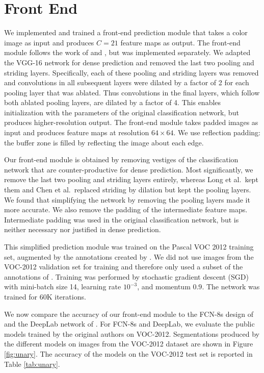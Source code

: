 \documentclass{article} %
\newcommand{\timess}{\mathbin{\!\times\!}}
\begin{document}
\section{Front End}
\label{sec:front-end}

We implemented and trained a front-end prediction module that takes a color image as input and produces $C=21$ feature maps as output. The front-end module follows the work of \cite{Long2015} and \cite{Chen2015ICLR}, but was implemented separately. We adapted the VGG-16 network \citep{SimonyanZisserman2015} for dense prediction and removed the last two pooling and striding layers. Specifically, each of these pooling and striding layers was removed and convolutions in all subsequent layers were dilated by a factor of 2 for each pooling layer that was ablated. Thus convolutions in the final layers, which follow both ablated pooling layers, are dilated by a factor of 4. This enables initialization with the parameters of the original classification network, but produces higher-resolution output. The front-end module takes padded images as input and produces feature maps at resolution $64\timess 64$. We use reflection padding: the buffer zone is filled by reflecting the image about each edge.

Our front-end module is obtained by removing vestiges of the classification network that are counter-productive for dense prediction. Most significantly, we remove the last two pooling and striding layers entirely, whereas Long et al.~kept them and Chen et al.~replaced striding by dilation but kept the pooling layers. We found that simplifying the network by removing the pooling layers made it more accurate. We also remove the padding of the intermediate feature maps. Intermediate padding was used in the original classification network, but is neither necessary nor justified in dense prediction.

This simplified prediction module was trained on the Pascal VOC 2012 training set, augmented by the annotations created by \cite{Hariharan2011}. We did not use images from the VOC-2012 validation set for training and therefore only used a subset of the annotations of \cite{Hariharan2011}. Training was performed by stochastic gradient descent (SGD) with mini-batch size 14, learning rate $10^{-3}$, and momentum $0.9$. The network was trained for 60K iterations.

We now compare the accuracy of our front-end module to the FCN-8s design of \cite{Long2015} and the DeepLab network of \cite{Chen2015ICLR}. For FCN-8s and DeepLab, we evaluate the public models trained by the original authors on VOC-2012. Segmentations produced by the different models on images from the VOC-2012 dataset are shown in Figure \ref{fig:unary}. The accuracy of the models on the VOC-2012 test set is reported in Table \ref{tab:unary}.
\end{document}
